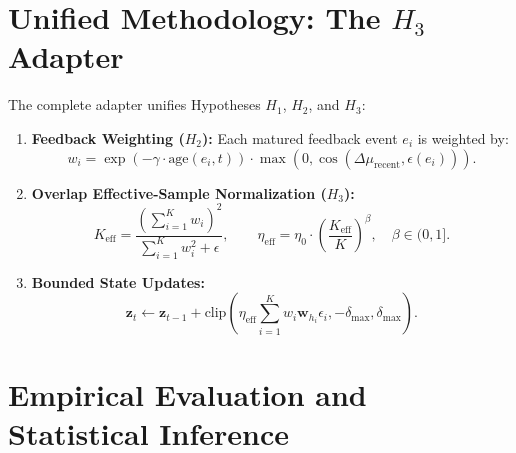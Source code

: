 \documentclass{article}
\begin{document}
\section{Unified Methodology: The $H_3$ Adapter}
The complete adapter unifies Hypotheses $H_1$, $H_2$, and $H_3$:
\begin{enumerate}
    \item \textbf{Feedback Weighting ($H_2$):} Each matured feedback event $e_i$ is weighted by:
    \begin{equation}
    w_i = \exp(-\gamma \cdot \text{age}(e_i, t)) \cdot \max\left(0, \cos(\Delta \mu_{\text{recent}}, \epsilon(e_i))\right).
    \end{equation}
    \item \textbf{Overlap Effective-Sample Normalization ($H_3$):}
    \begin{equation}
    K_{\text{eff}} = \frac{(\sum_{i=1}^K w_i)^2}{\sum_{i=1}^K w_i^2 + \epsilon}, \qquad \eta_{\text{eff}} = \eta_0 \cdot \left(\frac{K_{\text{eff}}}{K}\right)^\beta, \quad \beta \in (0, 1].
    \end{equation}
    \item \textbf{Bounded State Updates:}
    \begin{equation}
    \mathbf{z}_t \leftarrow \mathbf{z}_{t-1} + \text{clip}\left(\eta_{\text{eff}} \sum_{i=1}^K w_i \mathbf{w}_{h_i} \epsilon_i, -\delta_{\max}, \delta_{\max}\right).
    \end{equation}
\end{enumerate}

\section{Empirical Evaluation and Statistical Inference}
\end{document}
